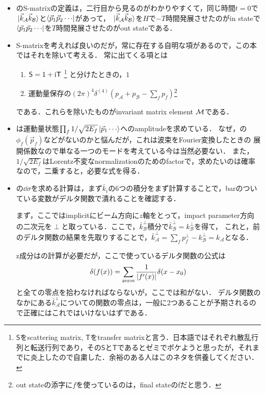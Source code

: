 \begin{itemize}
	\item {}のS-matrixの定義は，二行目から見るのがわかりやすくて，同じ時間$t=0$で$\ket*{\vec{k}_{\mathcal{A}}\vec{k}_{\mathcal{B}}}$と$\bra{\vec{p}_1\vec{p}_2\cdots}$があって，
		$\ket*{\vec{k}_{\mathcal{A}}\vec{k}_{\mathcal{B}}}$を$H$で$-T$時間発展させたのがin stateで
		$\bra{\vec{p}_1\vec{p}_2\cdots}$を$T$時間発展させたのがout stateである．
	\item S-matrixを考えれば良いのだが，常に存在する自明な項があるので，この本ではそれを除いて考える．
		常に出てくる項とは
		\begin{enumerate}
			\item $\mathsf{S} = 1 + \mathrm{i} \mathsf{T}$
				\footnote{$\mathsf{S}$をscattering matrix, $\mathsf{T}$をtransfer matrixと言う．日本語ではそれぞれ散乱行列と転送行列であり，その$\mathsf{S}$と$\mathsf{T}$であるとゼミでボケようと思ったが，それまでに炎上したので自粛した．余裕のある人はこのネタを供養してください．}
				と分けたときの，$1$
			\item 運動量保存の$(2\pi)^4\delta^{(4)}(p_{\mathcal{A}}+p_{\mathcal{B}} - \sum_fp_f)$\footnote{out stateの添字に$f$を使っているのは，final stateのfだと思う．}
		\end{enumerate}
		である．これらを除いたものがinvariant matrix element $\mathcal{M}$である．
	\item {}は運動量状態$\prod_f 1/\sqrt{2E_f}\ket{\vec{p}_1\cdots}$へのamplitudeを求めている．
		なぜ，の$\phi_f(\vec{p}_f)$などがないのかと悩んだが，これは波束をFourier変換したときの
		展開係数なので単なる一つのモードを考えている今は当然必要ない．
		また，$1/\sqrt{2E_f}$はLorentz不変なnormalizationのためのfactorで，求めたいのは確率なので，二乗すると，必要な式を得る．
	\item {}の$\dd{\sigma}$を求める計算は，まず$\bar{k}_i$の6つの積分をまず計算することで，barのついている変数がデルタ関数で潰れることを確認する．
		
		まず，ここではimplicitにビーム方向に$z$軸をとって，impact parameter方向の二次元を$\perp$と取っている．ここで，$\bar{k}_{\mathcal{B}}^{\perp}$積分で$\bar{k}_{\mathcal{B}}^{\perp} = k_{\mathcal{B}}^{\perp}$を得て，
		これと，前のデルタ関数の結果を先取りすることで，$\bar{k}_{\mathcal{A}}^{\perp} = \sum_fp_f^{\perp} - k_{\mathcal{B}}^{\perp} = k_{\mathcal{A}}$となる．

		z成分はの計算が必要だが，ここで使っているデルタ関数の公式は
		\begin{equation}
			\delta(f(x)) = \sum_{\text{zeros}}\frac{1}{\abs{f'(x)}}\delta(x-x_0)
		\end{equation}
		と全ての零点を拾わなければならないが，ここでは和がない．
		デルタ関数のなかにある$\bar{k}_{\mathcal{A}}^z$についての関数の零点は，一般に2つあることが予期されるので正確にはこれではいけないはずである．


\end{itemize}
